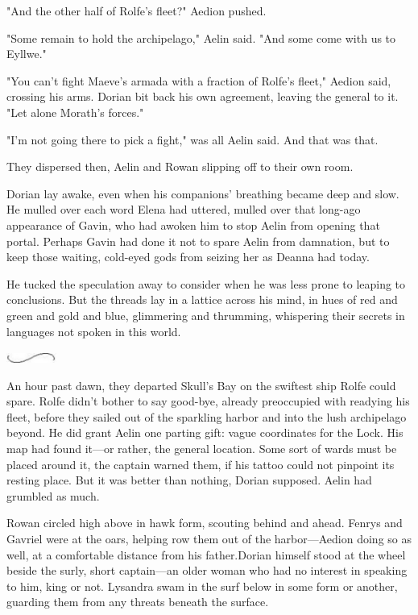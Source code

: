 "And the other half of Rolfe's fleet?"
Aedion pushed.

"Some remain to hold the archipelago," Aelin said.
"And some come with us to Eyllwe."

"You can't fight Maeve's armada with a fraction of Rolfe's fleet," Aedion said, crossing his arms.
Dorian bit back his own agreement, leaving the general to it.
"Let alone Morath's forces."

"I'm not going there to pick a fight," was all Aelin said.
And that was that.

They dispersed then, Aelin and Rowan slipping off to their own room.

Dorian lay awake, even when his companions' breathing became deep and slow.
He mulled over each word Elena had uttered, mulled over that long-ago appearance of Gavin, who had awoken him to stop Aelin from opening that portal.
Perhaps Gavin had done it not to spare Aelin from damnation, but to keep those waiting, cold-eyed gods from seizing her as Deanna had today.

He tucked the speculation away to consider when he was less prone to leaping to conclusions.
But the threads lay in a lattice across his mind, in hues of red and green and gold and blue, glimmering and thrumming, whispering their secrets in languages not spoken in this world.

\begin{center}
	\includegraphics[width=0.65in,height=0.13in]{images/seperator}
\end{center}

An hour past dawn, they departed Skull's Bay on the swiftest ship Rolfe could spare.
Rolfe didn't bother to say good-bye, already preoccupied with readying his fleet, before they sailed out of the sparkling harbor and into the lush archipelago beyond.
He did grant Aelin one parting gift: vague coordinates for the Lock.
His map had found it---or rather, the general location.
Some sort of wards must be placed around it, the captain warned them, if his tattoo could not pinpoint its resting place.
But it was better than nothing, Dorian supposed.
Aelin had grumbled as much.

Rowan circled high above in hawk form, scouting behind and ahead.
Fenrys and Gavriel were at the oars, helping row them out of the harbor---Aedion doing so as well, at a comfortable distance from his father.Dorian himself stood at the wheel beside the surly, short captain---an older woman who had no interest in speaking to him, king or not.
Lysandra swam in the surf below in some form or another, guarding them from any threats beneath the surface.

